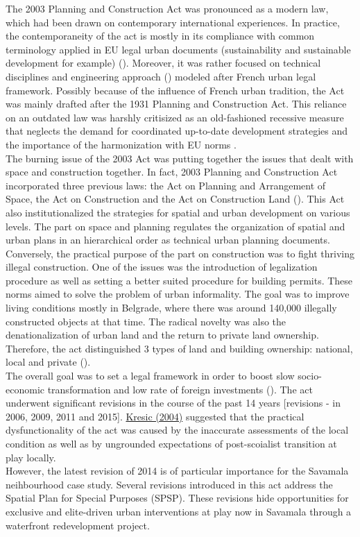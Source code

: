 \documentclass[11pt]{report}
\begin{document}
\begin{itemize}
The 2003 Planning and Construction Act was pronounced as a modern law, which had been drawn on contemporary international experiences. In practice, the contemporaneity of the act is mostly in its compliance with common terminology applied in EU legal urban documents (sustainability and sustainable development for example) (\cite{Zakon 2003}).
Moreover, it was rather focused on technical disciplines and engineering approach (\href{ref}{\citealt{nedovicbudic_waves_2006}}) modeled after French urban legal framework.
Possibly because of the influence of French urban tradition, the Act was mainly drafted after the 1931 Planning and Construction Act.
This reliance on an outdated law was harshly critisized as an old-fashioned  recessive measure that neglects the demand for coordinated up-to-date development strategies and the importance of the harmonization with EU norms \cite{ref}.
\\
The burning issue of the 2003 Act was putting together the issues that dealt with space and construction together. In fact, 2003 Planning and Construction Act incorporated three previous laws: the Act on Planning and Arrangement of Space, the Act on Construction and the Act on Construction Land (\cite{ref}).
This Act also institutionalized the strategies for spatial and urban development on various levels.
The part on space and planning regulates the organization of spatial and urban plans in an hierarchical order as technical urban planning documents.
Conversely, the practical purpose of the part on construction was to fight thriving illegal construction.
One of the issues was the introduction of legalization procedure as well as setting a better suited procedure for building permits. 
These norms aimed to solve the problem of urban informality.
The goal was to improve living conditions mostly in Belgrade, where there was around 140,000 illegally constructed objects at that time.
The radical novelty was also the denationalization of urban land and the return to private land ownership. Therefore, the act distinguished 3 types of land and building ownership: national, local and private (\href{ref}{\citealt{vujosevic_planning_2006}}).
\\
The overall goal was to set a legal framework in order to boost slow socio-economic transformation and low rate of foreign investments (\href{ref}{\citealt{vujovic_belgrades_2007}}).
The act underwent significant revisions in the course of the past 14 years [revisions - in 2006, 2009, 2011 and 2015].
\href{ref}{Kresic (2004)} suggested that the practical dysfunctionality of the act was caused by the inaccurate assessments of the local condition as well as by ungrounded expectations of post-scoialist transition at play locally.
\\
However, the latest revision of 2014 is of particular importance for the Savamala neihbourhood case study. Several revisions introduced in this act address the Spatial Plan for Special Purposes (SPSP). These revisions hide opportunities for exclusive and elite-driven urban interventions at play now in Savamala through a waterfront redevelopment project. 


\end{itemize}
\end{document}
